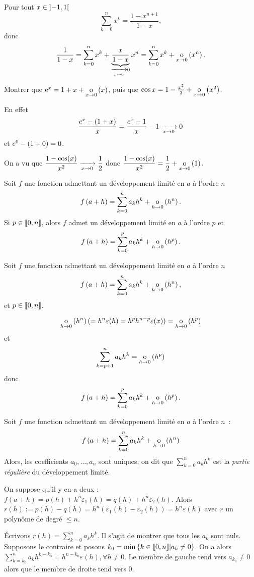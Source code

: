 \documentclass{magnolia}
\begin{document}
\begin{remarqueUnique}
\remarque Pour tout $x\in\left]-1,1\right[$
  \[\sum_{k=0}^n x^k=\frac{1-x^{n+1}}{1-x},\]
  donc
  \[\frac{1}{1-x}
    = \sum_{k=0}^n x^k+\underbrace{\frac{x}{1-x}}_{\xrightarrow[x\rightarrow 0]{}0}x^n
    = \sum_{k=0}^n x^k+\underset{x \rightarrow 0}{\text{o}}\left(x^n\right).\]
\end{remarqueUnique}

\begin{exoUnique}
\exo Montrer que ${\rm e}^x=1+x+\underset{x \rightarrow 0}{\text{o}}\left(x\right)$, puis que $\cos x=1-\frac{x^2}{2}+\underset{x \rightarrow 0}{\text{o}}\left(x^2\right)$.
\end{exoUnique}

\begin{sol}
En effet
   \[\frac{e^x-\left(1+x\right)}{x}=\frac{e^x-1}{x}-1\xrightarrow[x\rightarrow 0]{}0\]
   et $e^0-\left(1+0\right)=0$.
   
   On a vu que $\dfrac{1-\cos(x)}{x^2}\xrightarrow[x\rightarrow 0]{}\dfrac{1}{2}$ donc $\dfrac{1-\cos(x)}{x^2}=\dfrac{1}{2}+\underset{x \rightarrow 0}{\text{o}}\left(1\right).$
\end{sol}

\begin{proposition}[utile=-3, nom={Troncature d'un développement limité}]
Soit $f$ une fonction admettant un développement limité en $a$ à
l'ordre $n$
\[f\left(a+h\right)=\sum_{k=0}^n a_k h^k+\underset{h \rightarrow 0}{\text{o}}\left(h^n\right).\]
Si $p\in\left\llbracket 0,n\right\rrbracket$, alors $f$ admet un développement limité en
$a$ à l'ordre $p$ et
\[f\left(a+h\right)=\sum_{k=0}^p a_k h^k+\underset{h \rightarrow 0}{\text{o}}\left(h^p\right).\]
\end{proposition}

\begin{preuve}
Soit $f$ une fonction admettant un développement limité en $a$ à
l'ordre $n$
\[f\left(a+h\right)=\sum_{k=0}^n a_k h^k+\underset{h \rightarrow 0}{\text{o}}\left(h^n\right),\]
et $p\in\left\llbracket 0,n\right\rrbracket$.

\[\underset{h \rightarrow 0}{\text{o}}\left(h^n\right)(=h^n\varepsilon(h)=h^ph^{n-p}\varepsilon(x))=\underset{h \rightarrow 0}{\text{o}}\left(h^p\right)\]
et 
\[\sum_{k=p+1}^n a_k h^k=\underset{h \rightarrow 0}{\text{o}}\left(h^p\right)\]
donc 
\[f\left(a+h\right)=\sum_{k=0}^p a_k h^k+\underset{h \rightarrow 0}{\text{o}}\left(h^p\right).\]
\end{preuve}

\begin{proposition}[utile=-3]
Soit $f$ une fonction admettant un développement limité en $a$ à
l'ordre $n$~:
\[f\left(a+h\right)=\sum_{k=0}^n a_k h^k+\underset{h \rightarrow 0}{\text{o}}\left(h^n\right)\]
Alors, les coefficients $a_0,\ldots,a_n$ sont uniques; on dit que
$\sum_{k=0}^n a_k h^k$ est la \emph{partie régulière} du développement limité.
\end{proposition}

\begin{preuve}
On suppose qu'il y en a deux : $f(a+h)=p(h)+h^n\varepsilon_1(h)=q(h)+h^n\varepsilon_2(h)$. Alors $r(h):=p(h)-q(h)=h^n(\varepsilon_1(h)-\varepsilon_2(h))=h^n\varepsilon(h)$ avec $r$ un polynôme de degré $\leq n$.

\'Ecrivons $r(h)=\displaystyle\sum_{k=0}^na_kh^k$. Il s'agit de montrer que tous les $a_k$ sont nuls. Supposons le contraire et posons $k_0=\min\left\{k\in\llbracket0,n\rrbracket | a_k\neq0\right\}$. On a alors $\displaystyle \sum_{k=k_0}^na_k h^{k-k_0}=h^{n-k_0}\varepsilon(h), \forall h\neq 0$. Le membre de gauche tend vers $a_{k_0}\neq 0$ alors que le membre de droite tend vers $0$.
\end{preuve}
\end{document}
